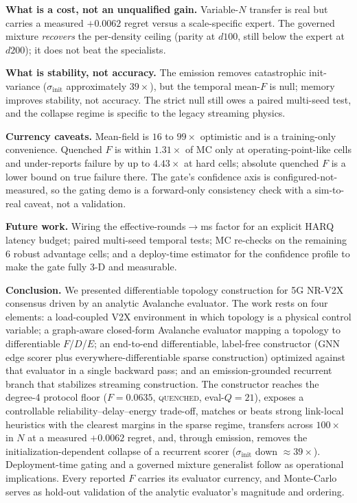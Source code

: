 \documentclass[journal]{IEEEtran}
\newcommand{\sinit}{\ensuremath{\sigma_{\mathrm{init}}}}
\newcommand{\qq}{\textsc{quenched}}
\begin{document}
\textbf{What is a cost, not an unqualified gain.} Variable-$N$ transfer is real but
carries a measured $+0.0062$ regret versus a scale-specific expert. The governed
mixture \emph{recovers} the per-density ceiling (parity at $d100$, still below
the expert at $d200$); it does not beat the specialists.

\textbf{What is stability, not accuracy.} The emission removes catastrophic
init-variance ($\sinit$ approximately $39\times$), but the temporal mean-$F$ is null;
memory improves stability, not accuracy. The strict null still owes a paired
multi-seed test, and the collapse regime is specific to the legacy streaming
physics.

\textbf{Currency caveats.} Mean-field is $16$ to $99\times$ optimistic and is a
training-only convenience. Quenched $F$ is within $1.31\times$ of MC only at
operating-point-like cells and under-reports failure by up to $4.43\times$ at
hard cells; absolute quenched $F$ is a lower bound on true failure there. The
gate's confidence axis is configured-not-measured, so the gating demo is a
forward-only consistency check with a sim-to-real caveat, not a validation.

\textbf{Future work.} Wiring the effective-rounds$\to$ms factor for an explicit
HARQ latency budget; paired multi-seed temporal tests; MC re-checks on the
remaining 6 robust advantage cells; and a deploy-time estimator for the
confidence profile to make the gate fully 3-D and measurable.

\textbf{Conclusion.} We presented differentiable topology construction for 5G
NR-V2X consensus driven by an analytic Avalanche evaluator. The work rests on
four elements: a load-coupled V2X environment in which topology is a physical
control variable; a graph-aware closed-form Avalanche evaluator mapping a topology
to differentiable $F$/$D$/$E$; an end-to-end differentiable, label-free
constructor (GNN edge scorer plus everywhere-differentiable sparse construction)
optimized against that evaluator in a single backward pass; and an
emission-grounded recurrent branch that stabilizes streaming construction. The
constructor reaches the degree-4 protocol floor ($F=0.0635$, \qq{}, eval-$Q{=}21$),
exposes a controllable reliability--delay--energy trade-off, matches or beats
strong link-local heuristics with the clearest margins in the sparse regime,
transfers across $100\times$ in $N$ at a measured $+0.0062$ regret, and, through
emission, removes the initialization-dependent collapse of a recurrent scorer
($\sinit$ down $\approx39\times$). Deployment-time gating and a governed mixture
generalist follow as operational implications. Every reported $F$ carries its
evaluator currency, and Monte-Carlo serves as hold-out validation of the analytic
evaluator's magnitude and ordering.



\end{document}
